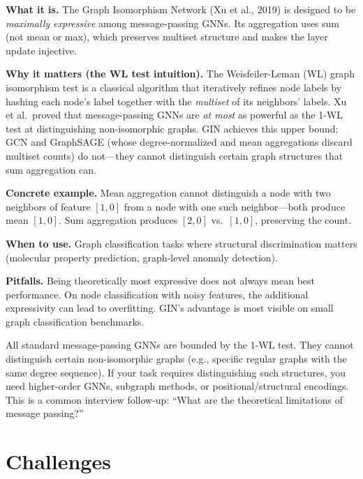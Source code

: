 \textbf{What it is.} The Graph Isomorphism Network (Xu et al., 2019) is designed to be \textit{maximally expressive} among message-passing GNNs. Its aggregation uses sum (not mean or max), which preserves multiset structure and makes the layer update injective.

\textbf{Why it matters (the WL test intuition).} The Weisfeiler-Leman (WL) graph isomorphism test is a classical algorithm that iteratively refines node labels by hashing each node's label together with the \textit{multiset} of its neighbors' labels. Xu et al.\ proved that message-passing GNNs are \textit{at most} as powerful as the 1-WL test at distinguishing non-isomorphic graphs. GIN achieves this upper bound; GCN and GraphSAGE (whose degree-normalized and mean aggregations discard multiset counts) do not---they cannot distinguish certain graph structures that sum aggregation can.

\textbf{Concrete example.} Mean aggregation cannot distinguish a node with two neighbors of feature $[1, 0]$ from a node with one such neighbor---both produce mean $[1, 0]$. Sum aggregation produces $[2, 0]$ vs.\ $[1, 0]$, preserving the count.

\textbf{When to use.} Graph classification tasks where structural discrimination matters (molecular property prediction, graph-level anomaly detection).

\textbf{Pitfalls.} Being theoretically most expressive does not always mean best performance. On node classification with noisy features, the additional expressivity can lead to overfitting. GIN's advantage is most visible on small graph classification benchmarks.

\begin{warningbox}
All standard message-passing GNNs are bounded by the 1-WL test. They cannot distinguish certain non-isomorphic graphs (e.g., specific regular graphs with the same degree sequence). If your task requires distinguishing such structures, you need higher-order GNNs, subgraph methods, or positional/structural encodings. This is a common interview follow-up: ``What are the theoretical limitations of message passing?''
\end{warningbox}

\section{Challenges}
\label{sec:gnn_challenges}

